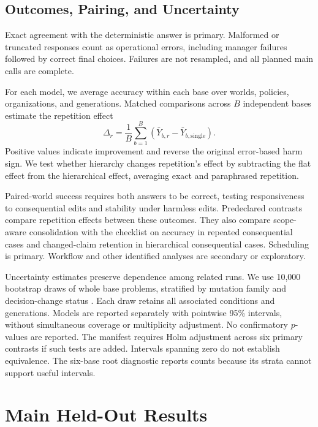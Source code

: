 \documentclass{svproc}
\begin{document}
\subsection{Outcomes, Pairing, and Uncertainty}
Exact agreement with the deterministic answer is primary. Malformed or truncated
responses count as operational errors, including manager failures followed by
correct final choices. Failures are not resampled, and all planned main calls
are complete.

For each model, we average accuracy within each base over worlds, policies,
organizations, and generations. Matched comparisons across $B$ independent
bases estimate the repetition effect
\begin{equation}
 \Delta_r=\frac{1}{B}\sum_{b=1}^{B}
 \left(\bar Y_{b,r}-\bar Y_{b,\mathrm{single}}\right).
\label{eq:effect}
\end{equation}
Positive values indicate improvement and reverse the original error-based harm
sign. We test whether hierarchy changes repetition's effect by subtracting the
flat effect from the hierarchical effect, averaging exact and paraphrased
repetition.

Paired-world success requires both answers to be correct, testing responsiveness
to consequential edits and stability under harmless edits. Predeclared contrasts
compare repetition effects between these outcomes. They also compare
scope-aware consolidation with the checklist on accuracy in repeated
consequential cases and changed-claim retention in hierarchical consequential
cases. Scheduling is primary. Workflow and other identified analyses are
secondary or exploratory.

Uncertainty estimates preserve dependence among related runs. We use 10,000
bootstrap draws of whole base problems, stratified by mutation family and
decision-change status \cite{clusterbootstrap}. Each draw retains all associated
conditions and generations. Models are reported separately with pointwise 95\%
intervals, without simultaneous coverage or multiplicity adjustment.
No confirmatory $p$-values are reported. The manifest requires Holm adjustment
across six primary contrasts if such tests are added. Intervals spanning zero
do not establish equivalence. The six-base root diagnostic reports counts
because its strata cannot support useful intervals.









\section{Main Held-Out Results}
\end{document}
